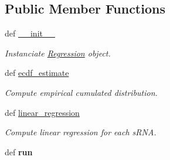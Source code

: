 \subsection*{\-Public \-Member \-Functions}
\begin{DoxyCompactItemize}
\item 
def \hyperlink{classiRNA__stat_1_1Regression_1_1Regression_a876b4f8382e632699d79e5d0db9c236d}{\-\_\-\-\_\-init\-\_\-\-\_\-}
\begin{DoxyCompactList}\small\item\em \-Instanciate \hyperlink{classiRNA__stat_1_1Regression_1_1Regression}{\-Regression} object. \end{DoxyCompactList}\item 
\hypertarget{classiRNA__stat_1_1Regression_1_1Regression_afaff83cdf10ac5049aae6b693e91a72f}{
def \hyperlink{classiRNA__stat_1_1Regression_1_1Regression_afaff83cdf10ac5049aae6b693e91a72f}{ecdf\-\_\-estimate}}
\label{classiRNA__stat_1_1Regression_1_1Regression_afaff83cdf10ac5049aae6b693e91a72f}

\begin{DoxyCompactList}\small\item\em \-Compute empirical cumulated distribution. \end{DoxyCompactList}\item 
\hypertarget{classiRNA__stat_1_1Regression_1_1Regression_aa5900bf63d527b985203455d340131e7}{
def \hyperlink{classiRNA__stat_1_1Regression_1_1Regression_aa5900bf63d527b985203455d340131e7}{linear\-\_\-regression}}
\label{classiRNA__stat_1_1Regression_1_1Regression_aa5900bf63d527b985203455d340131e7}

\begin{DoxyCompactList}\small\item\em \-Compute linear regression for each s\-R\-N\-A. \end{DoxyCompactList}\item 
\hypertarget{classiRNA__stat_1_1Regression_1_1Regression_a3516604f4a97efed5457205b9d090f3e}{
def {\bfseries run}}
\label{classiRNA__stat_1_1Regression_1_1Regression_a3516604f4a97efed5457205b9d090f3e}

\end{DoxyCompactItemize}
